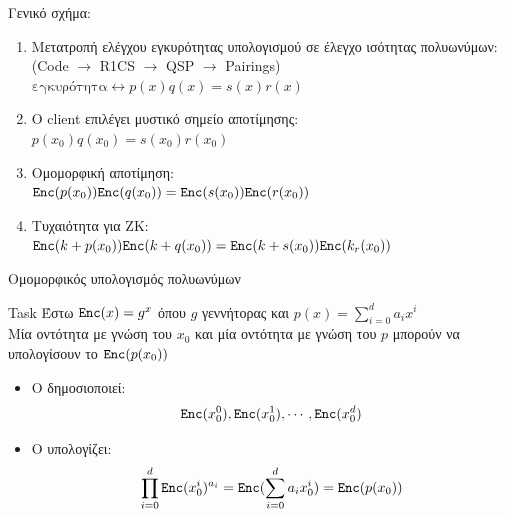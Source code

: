 \documentclass[handout]{beamer}
\begin{document}
\begin{frame}{Γενικό σχήμα:}
\begin{small}
\begin{enumerate}
\item Μετατροπή ελέγχου εγκυρότητας υπολογισμού σε έλεγχο ισότητας πολυωνύμων: (Code $\rightarrow$ R1CS $\rightarrow$ QSP $\rightarrow$ Pairings)\\
$\textrm{εγκυρότητα} \leftrightarrow p(x)q(x)=s(x)r(x)$ \pause
\item Ο client επιλέγει μυστικό σημείο αποτίμησης:  \\ 
$ p(x_0)q(x_0)=s(x_0)r(x_0) $ \pause
\item Ομομορφική αποτίμηση: \\
$ \mathtt{Enc}(p(x_0))\mathtt{Enc}(q(x_0))=\mathtt{Enc}(s(x_0))\mathtt{Enc}(r(x_0)) $ \pause
\item Τυχαιότητα για ZK: \\
$\mathtt{Enc}(k+p(x_0))\mathtt{Enc}(k+q(x_0))=\mathtt{Enc}(k+s(x_0))\mathtt{Enc}(k_ r(x_0))$
\end{enumerate}
\end{small}
\end{frame}

\begin{frame}{Ομομορφικός υπολογισμός πολυωνύμων}
	\begin{block}{Task}
		Έστω $\mathtt{Enc}(x) = g^x$ όπου $g$ γεννήτορας και $p(x)=\sum_{i=0}^d a_i x^i$ \\
		
		Μία οντότητα \ver με γνώση του $x_0$ και μία οντότητα \prv με γνώση του $p$ μπορούν να υπολογίσουν το $\mathtt{Enc}(p(x_0))$
	\end{block} \pause
	
		\begin{itemize}
	   
		\item Ο \ver δημοσιοποιεί:
		\begin{align*}\mathtt{Enc}(x_0^0), \mathtt{Enc}(x_0^1), \cdots, \mathtt{Enc}(x_0^d)\end{align*} 
		\item Ο \prv υπολογίζει:  
		\begin{align*}\prod_{i=0}^d \mathtt{Enc}(x_0^i)^{a_i} = \mathtt{Enc}(\sum_{i=0}^{d} a_i x_0^i) = \mathtt{Enc}(p(x_0))  \end{align*} 
	
		\end{itemize}
\end{frame}
\end{document}
